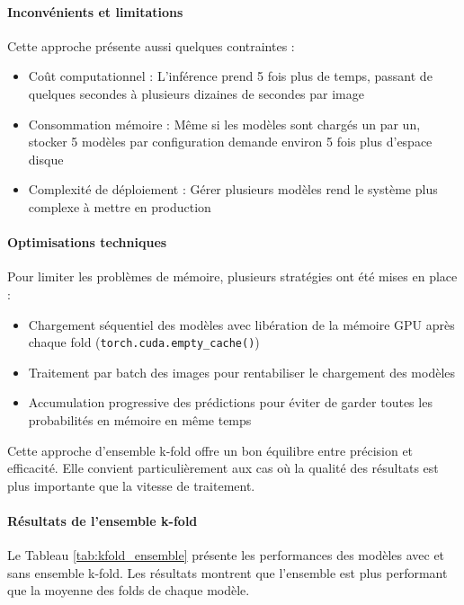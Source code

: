\paragraph{Inconvénients et limitations}

Cette approche présente aussi quelques contraintes :

\begin{itemize}
    \item Coût computationnel : L'inférence prend 5 fois plus de temps, passant de quelques secondes à plusieurs dizaines de secondes par image
    \item Consommation mémoire : Même si les modèles sont chargés un par un, stocker 5 modèles par configuration demande environ 5 fois plus d'espace disque
    \item Complexité de déploiement : Gérer plusieurs modèles rend le système plus complexe à mettre en production
\end{itemize}

\paragraph{Optimisations techniques}

Pour limiter les problèmes de mémoire, plusieurs stratégies ont été mises en place :

\begin{itemize}
    \item Chargement séquentiel des modèles avec libération de la mémoire GPU après chaque fold (\texttt{torch.cuda.empty\_cache()})
    \item Traitement par batch des images pour rentabiliser le chargement des modèles
    \item Accumulation progressive des prédictions pour éviter de garder toutes les probabilités en mémoire en même temps
\end{itemize}

Cette approche d'ensemble k-fold offre un bon équilibre entre précision et efficacité. Elle convient particulièrement aux cas où la qualité des résultats est plus importante que la vitesse de traitement.

\paragraph{Résultats de l'ensemble k-fold}

Le Tableau \ref{tab:kfold_ensemble} présente les performances des modèles avec et sans ensemble k-fold. Les résultats montrent que l'ensemble est plus performant que la moyenne des folds de chaque modèle.

